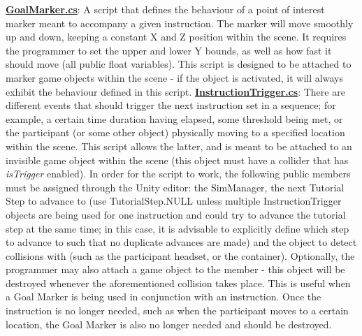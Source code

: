 \documentclass{article}
\begin{document}
\href{https://bit.ly/2Yooc2m}{\textbf{GoalMarker.cs}}: A script that defines the behaviour of a point of interest marker meant to accompany a given instruction. The marker will move smoothly up and down, keeping a constant X and Z position within the scene. It requires the programmer to set the upper and lower Y bounds, as well as how fast it should move (all public float variables). This script is designed to be attached to marker game objects within the scene - if the object is activated, it will always exhibit the behaviour defined in this script. \newline \newline
\href{https://bit.ly/2uwAQ1u}{\textbf{InstructionTrigger.cs}}: There are different events that should trigger the next instruction set in a sequence; for example, a certain time duration having elapsed, some threshold being met, or the participant (or some other object) physically moving to a specified location within the scene. This script allows the latter, and is meant to be attached to an invisible game object within the scene (this object must have a collider that has \textit{isTrigger} enabled). In order for the script to work, the following public members must be assigned through the Unity editor: the SimManager, the next Tutorial Step to advance to (use TutorialStep.NULL unless multiple InstructionTrigger objects are being used for one instruction and could try to advance the tutorial step at the same time; in this case, it is advisable to explicitly define which step to advance to such that no duplicate advances are made) and the object to detect collisions with (such as the participant headset, or the container). Optionally, the programmer may also attach a game object to the  member - this object will be destroyed whenever the aforementioned collision takes place. This is useful when a Goal Marker is being used in conjunction with an instruction. Once the instruction is no longer needed, such as when the participant moves to a certain location, the Goal Marker is also no longer needed and should be destroyed. 
\end{document}
